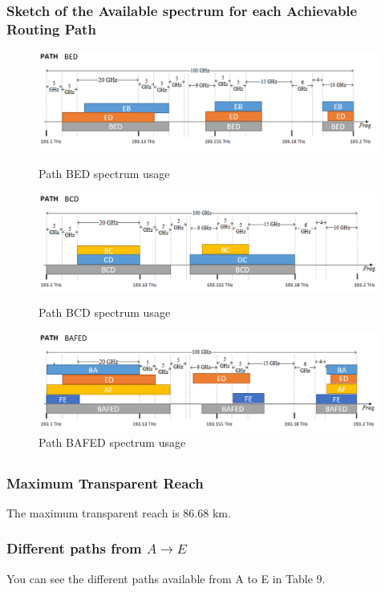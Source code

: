 \documentclass{article}
\begin{document}
\subsubsection{Sketch of the Available spectrum for each Achievable Routing Path}


\begin{figure}[htb!]
    \centering
    \includegraphics[scale=0.5]{spectrum-path-bed}
    \caption{Path BED spectrum usage}
    \includegraphics[scale=0.5]{spectrum-path-bcd}
    \caption{Path BCD spectrum usage}
    \includegraphics[scale=0.5]{spectrum-path-bafed}
    \caption{Path BAFED spectrum usage}
\end{figure}

\subsection{}
\subsubsection{Maximum Transparent Reach}

The maximum transparent reach is 86.68 km.

\subsubsection{Different paths from $A \to E$}
You can see the different paths available from A to E in Table 9.
\end{document}
